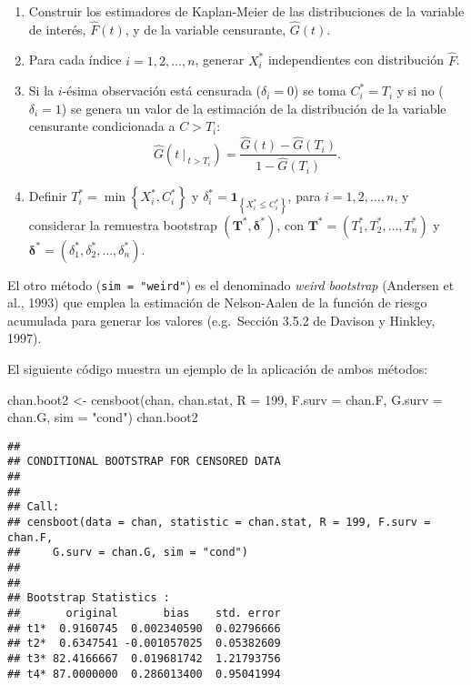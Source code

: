 \documentclass[
]{book}
\newenvironment{Shaded}{\begin{snugshade}}{\end{snugshade}}
\newcommand{\AttributeTok}[1]{\textcolor[rgb]{0.77,0.63,0.00}{#1}}
\newcommand{\DecValTok}[1]{\textcolor[rgb]{0.00,0.00,0.81}{#1}}
\newcommand{\FunctionTok}[1]{\textcolor[rgb]{0.00,0.00,0.00}{#1}}
\newcommand{\NormalTok}[1]{#1}
\newcommand{\OtherTok}[1]{\textcolor[rgb]{0.56,0.35,0.01}{#1}}
\newcommand{\StringTok}[1]{\textcolor[rgb]{0.31,0.60,0.02}{#1}}
\theoremstyle{break}
\theoremstyle{definition}
\theoremstyle{definition}
\theoremstyle{definition}
\theoremstyle{definition}
\theoremstyle{remark}
\begin{document}
\begin{enumerate}
\def\labelenumi{\arabic{enumi}.}
\item
  Construir los estimadores de Kaplan-Meier de las distribuciones de
  la variable de interés, \(\hat{F}\left( t \right)\), y de la variable
  censurante, \(\hat{G}\left( t \right)\).
\item
  Para cada índice \(i=1,2,\ldots ,n\), generar \(X_i^{\ast}\) independientes
  con distribución \(\hat{F}\).
\item
  Si la \(i\)-ésima observación está censurada (\(\delta_i=0\)) se toma
  \(C_i^{\ast}=T_i\) y si no (\(\delta_i=1\)) se genera un valor de la estimación
  de la distribución de la variable censurante condicionada a \(C > T_i\):
  \[\hat G \left(\left. t \ \right\vert_{\ t > T_i} \right) 
  = \frac{\hat G(t) - \hat G(T_i)}{1- \hat G(T_i)}.\]
\item
  Definir \(T_i^{\ast}=\min \left\{ X_i^{\ast},C_i^{\ast}\right\}\) y
  \(\delta_i^{\ast}=\mathbf{1}_{\left\{ X_i^{\ast}\leq C_i^{\ast}\right\}}\), para \(i = 1, 2, \ldots, n\),
  y considerar la remuestra bootstrap
  \(\left( \mathbf{T}^{\ast},\boldsymbol{\delta}^{\ast}\right)\), con
  \(\mathbf{T}^{\ast}=\left( T_1^{\ast},T_2^{\ast}, \ldots, T_n^{\ast} \right)\) y \(\boldsymbol{\delta}^{\ast} = \left( \delta_1^{\ast}, \delta_2^{\ast},\ldots ,\delta_n^{\ast} \right)\).
\end{enumerate}

El otro método (\texttt{sim\ =\ "weird"}) es el denominado \emph{weird bootstrap}
(Andersen et al., 1993) que emplea la estimación de Nelson-Aalen de la
función de riesgo acumulada para generar los valores
(e.g.~Sección 3.5.2 de Davison y Hinkley, 1997).

El siguiente código muestra un ejemplo de la aplicación de ambos métodos:

\begin{Shaded}
\begin{Highlighting}[]
\NormalTok{chan.boot2 }\OtherTok{\textless{}{-}} \FunctionTok{censboot}\NormalTok{(chan, chan.stat, }\AttributeTok{R =} \DecValTok{199}\NormalTok{, }\AttributeTok{F.surv =}\NormalTok{ chan.F, }
                  \AttributeTok{G.surv =}\NormalTok{ chan.G, }\AttributeTok{sim =} \StringTok{"cond"}\NormalTok{)}
\NormalTok{chan.boot2}
\end{Highlighting}
\end{Shaded}

\begin{verbatim}
## 
## CONDITIONAL BOOTSTRAP FOR CENSORED DATA
## 
## 
## Call:
## censboot(data = chan, statistic = chan.stat, R = 199, F.surv = chan.F, 
##     G.surv = chan.G, sim = "cond")
## 
## 
## Bootstrap Statistics :
##       original       bias    std. error
## t1*  0.9160745  0.002340590  0.02796666
## t2*  0.6347541 -0.001057025  0.05382609
## t3* 82.4166667  0.019681742  1.21793756
## t4* 87.0000000  0.286013400  0.95041994
\end{verbatim}
\end{document}
